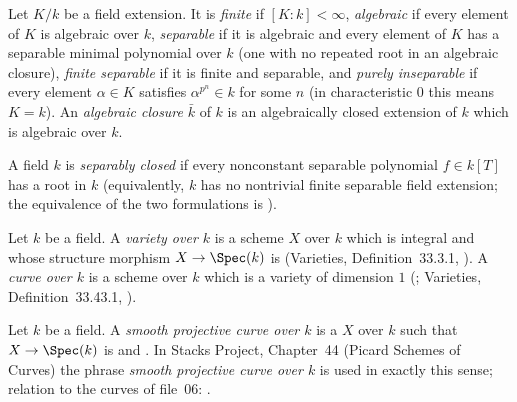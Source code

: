 \begin{definition}\label{def:pc-field-tower}
Let $K/k$ be a field extension.  It is \emph{finite} if $[K:k]<\infty$,
\emph{algebraic} if every element of $K$ is algebraic over $k$,
\emph{separable} if it is algebraic and every element of $K$ has a
separable minimal polynomial over $k$ (one with no repeated root in an
algebraic closure), \emph{finite separable} if it is finite and
separable, and \emph{purely inseparable} if every
element $\alpha\in K$ satisfies $\alpha^{p^n}\in k$ for some $n$ (in
characteristic $0$ this means $K=k$).  An \emph{algebraic closure}
$\bar k$ of $k$ is an algebraically closed extension of $k$ which is
algebraic over $k$.
\end{definition}

\begin{definition}\label{def:pc-separably-closed}
A field $k$ is \emph{separably closed} if every nonconstant separable
polynomial $f\in k[T]$ has a root in $k$ (equivalently, $k$ has no
nontrivial finite separable field extension; the equivalence of the two
formulations is ).
\mathlibok\ 
\end{definition}

\begin{definition}[Curves]\label{def:pc-curve}
Let $k$ be a field.  A \emph{variety over $k$} is a scheme $X$ over $k$
which is integral and whose structure morphism $X\to\Spec(k)$ is
(Varieties, Definition~33.3.1,
).  A
\emph{curve over $k$} is a scheme over $k$ which is a variety of
dimension $1$ (; Varieties, Definition~33.43.1,
).
\leanok
\end{definition}

\begin{definition}\label{def:pc-smooth-projective-curve}
Let $k$ be a field.  A \emph{smooth projective curve over $k$} is a
 $X$ over $k$ such that $X\to\Spec(k)$ is
 and
.  In Stacks Project,
Chapter~44 (Picard Schemes of Curves) the phrase \emph{smooth projective
curve over $k$} is used in exactly this sense; relation to the curves of
file~06: .
\leanok
\end{definition}

